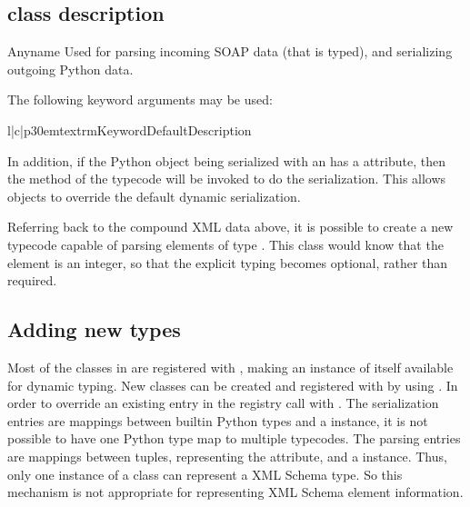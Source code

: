 \subsection{class description}
\begin{classdesc}{Any}{name}
Used for parsing incoming SOAP data (that is typed), and serializing
outgoing Python data.

The following keyword arguments may be used:

\begin{tableiii}{l|c|p{30em}}{textrm}{Keyword}{Default}{Description}
\end{tableiii}

In addition, if the Python object being serialized with an 
has a  attribute, then the  method of
the typecode will be invoked to do the serialization.
This allows objects to override the default dynamic serialization.
\end{classdesc}

Referring back to the compound XML data above, it is possible to create a new
typecode capable of parsing elements of type .
This class would know that the  element is an integer,
so that the explicit typing becomes optional, rather than required.

\subsection{Adding new types} Most of the  classes in
 are registered with , making an instance of itself
available for dynamic typing.  New  classes can be created and
registered with  by using .  In order to
override an existing entry in the registry call  with
.  The serialization entries are mappings between builtin
Python types and a  instance, it is not possible to have one
Python type map to multiple typecodes.  The parsing entries are mappings
between   tuples, representing the 
attribute, and a  instance.  Thus, only one instance of a
 class can represent a XML Schema type.  So this mechanism is
not appropriate for representing XML Schema element information.

